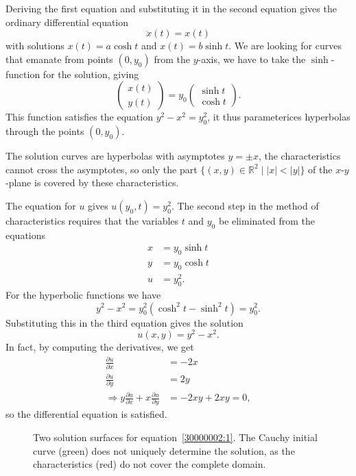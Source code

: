 \begin{loesung}
\begin{teilaufgaben}
Deriving the first equation and substituting it in the second equation
gives the ordinary differential equation
\[
\ddot x(t)=x(t)
\]
with solutions
$x(t)=a\cosh t$ and $x(t)=b\sinh t$.
We are looking for curves that emanate from points $(0,y_0)$ from
the $y$-axis, we have to take the $\sinh$-function for the solution,
giving
\[
\begin{pmatrix}
x(t)\\y(t)
\end{pmatrix}
=
y_0
\begin{pmatrix}
\sinh t\\
\cosh t
\end{pmatrix}.
\]
This function satisfies the equation $y^2-x^2=y_0^2$, it thus
parameterices hyperbolas through the points $(0,y_0)$.
\item
The solution curves are hyperbolas with asymptotes $y=\pm x$,
the characteristics cannot cross the asymptotes, so only the part
$\{(x,y)\in\mathbb R^2\;|\;|x|<|y|\}$ of the $x$-$y$-plane is covered by these
characteristics.
\item
The equation for $u$ gives $u(y_0, t)=y_0^2$.
The second step in the method of characteristics requires that the
variables $t$ and $y_0$ be eliminated from the equations
\begin{align*}
x&=y_0\sinh t\\
y&=y_0\cosh t\\
u&=y_0^2.
\end{align*}
For the hyperbolic functions we have
\[
y^2-x^2=y_0^2(\cosh^2t-\sinh^2t)=y_0^2.
\]
Substituting this in the third equation gives the solution
\[
u(x,y)=y^2-x^2.
\]
In fact, by computing the derivatives, we get
\begin{align*}
\frac{\partial u}{\partial x}&=-2x\\
\frac{\partial u}{\partial y}&=2y\\
\Rightarrow
y\frac{\partial u}{\partial x}+x\frac{\partial u}{\partial y}&=-2xy+2xy=0,
\end{align*}
so the differential equation is satisfied.
\begin{figure}
\centering
{}
\caption{Two solution surfaces for equation~\eqref{30000002:1}.
The Cauchy initial curve (green) does not uniquely determine the solution,
as the characteristics (red) do not cover the complete domain.
}
\end{figure}
\end{teilaufgaben}
\end{loesung}
